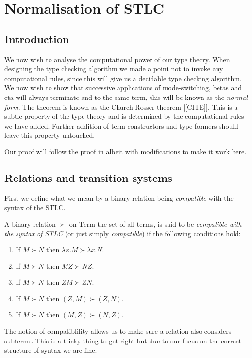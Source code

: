 \section{Normalisation of STLC}

\subsection{Introduction}
We now wish to analyse the computational power of our type theory. When designing the type checking algorithm we made a point not to invoke any computational rules, since this will give us a decidable type checking algorithm. We now wish to show that successive applications of mode-switching, betas and eta will always terminate and to the same term, this will be known as the \emph{normal form}. The theorem is known as the Church-Rosser theorem [[CITE]]. This is a subtle property of the type theory and is determined by the computational rules we have added. Further addition of term constructors and type formers should leave this property untouched.

Our proof will follow the proof in \cite[p. 67]{Sorensen} albeit with modifications to make it work here. 

\subsection{Relations and transition systems}

First we define what we mean by a binary relation being \emph{compatible} with the syntax of the STLC.
\begin{defin}
    A binary relation $\succ$ on $\mathrm{Term}$ the set of all terms, is said to be \emph{compatible with the syntax of STLC} (or just simply \emph{compatible}) if the following conditions hold:
    \begin{enumerate}
        \item If $M \succ N$ then $\lambda x . M \succ \lambda x . N$.
        \item If $M \succ N$ then $M Z \succ N Z$.
        \item If $M \succ N$ then $Z M \succ Z N$.
        \item If $M \succ N$ then $(Z,M) \succ (Z,N)$.
        \item If $M \succ N$ then $(M, Z) \succ (N, Z)$.
    \end{enumerate}
\end{defin}

\begin{remark}
    The notion of compatiblility allows us to make sure a relation also considers subterms. This is a tricky thing to get right but due to our focus on the correct structure of syntax we are fine.
\end{remark}

